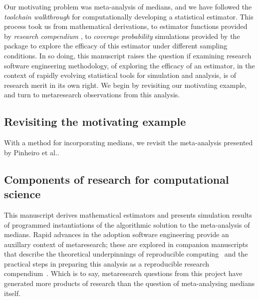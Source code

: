 \documentclass{article}
\begin{document}
Our motivating problem was meta-analysis of medians, and we have followed the \emph{toolchain walkthrough} for computationally developing a statistical estimator. This process took us from mathematical derivations, to estimator functions provided by \emph{research compendium} , to \emph{coverage probability} simulations provided by the package  to explore the efficacy of this estimator under different sampling conditions. In so doing, this manuscript raises the question if examining research software engineering methodology, of exploring the efficacy of an estimator, in the context of rapidly evolving statistical tools for simulation and analysis, is of research merit in its own right. We begin by revisiting our motivating example, and turn to metaresearch observations from this analysis.

\subsection{Revisiting the motivating example}
\label{sec: pin again}

With a method for incorporating medians, we revisit the meta-analysis presented by Pinheiro et al..




\subsection{Components of research for computational science}



This manuscript derives mathematical estimators and presents simulation results of programmed instantiations of the algorithmic solution to the meta-analysis of medians. Rapid advances in the adoption software engineering provide an auxillary context of metaresearch; these are explored in companion manuscripts that describe the theoretical underpinnings of reproducible computing~\cite{grayTruthProofReproducibility2019} and the practical steps in preparing this analysis as a reproducible research compendium~\cite{gray2019textttcodeproof}. Which is to say, metaresearch questions from this project have generated more products of research than the question of meta-analysing medians itself.
\end{document}
